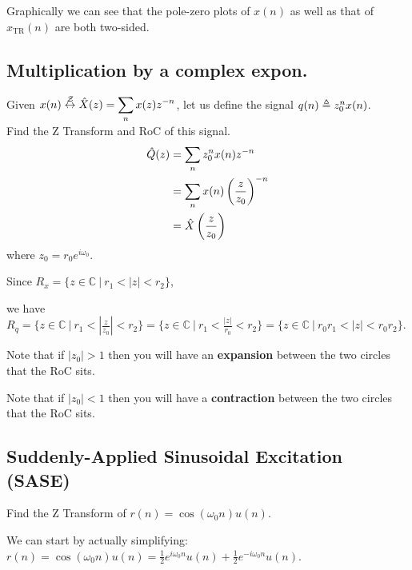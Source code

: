 Graphically we can see that the pole-zero plots of $x(n)$ as well as that of $x_{\text{TR}}(n)$ are both two-sided.

\subsection{Multiplication by a complex expon.}
Given $x(n)\stackrel{\mathcal{Z}}{\leftrightarrow}\hat{X}(z)=\displaystyle\sum_n x(z)z^{-n}$, let us define the signal $q(n)\triangleq z_{0}^{n} x(n)$. \\
Find the Z Transform and RoC of this signal.
\begin{align*}
    \hat Q(z) 
    &= \sum_n z_{0}^{n} x(n)z^{-n}
    \\
    &= \sum_n x(n)\left(\frac{z}{z_0}\right)^{-n}
    \\
    &= \hat{X}\left(\frac{z}{z_0}\right)
\end{align*}
where $z_0=r_0e^{i\omega_0}$.

Since $R_x=\{z\in\mathbb C\ \Big|\ r_1<|z|<r_2\}$,

we have $R_{q} = \{z\in\mathbb C\ \Big|\ r_1<\left|\frac{z}{z_0}\right|<r_2\}
= \{z\in\mathbb C\ \Big|\ r_1<\frac{|z|}{r_0}<r_2\}
= \{z\in\mathbb C\ \Big|\ {r_0}r_1<{|z|}<{r_0}r_2\}$.

Note that if $|z_0|>1$ then you will have an \textbf{expansion} between the two circles that the RoC sits.

Note that if $|z_0|<1$ then you will have a \textbf{contraction} between the two circles that the RoC sits.

\subsection{Suddenly-Applied Sinusoidal Excitation (SASE)}
Find the Z Transform of $r(n)=\cos(\omega_0 n) u(n)$.

We can start by actually simplifying: $r(n)=\cos(\omega_0 n) u(n) = \frac12e^{i\omega_0 n}u(n)+\frac12e^{-i\omega_0 n}u(n)$.

